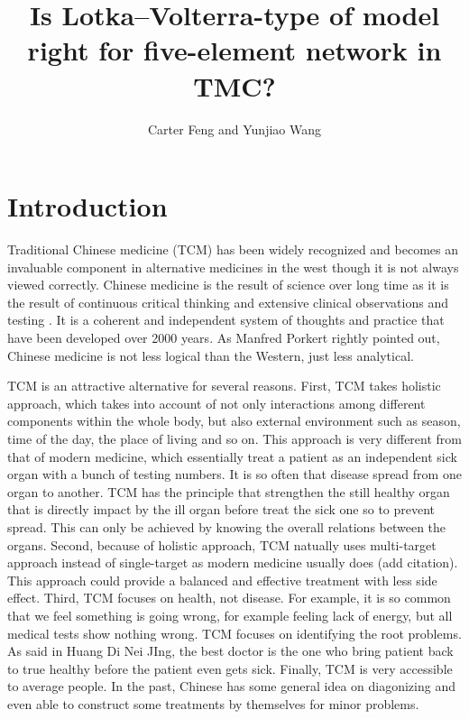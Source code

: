 \documentclass{article}
\title{Is Lotka–Volterra-type of model right for five-element network in TMC?}
\author{Carter Feng and Yunjiao Wang}
\begin{document}
\renewcommand{\figurename}{Figure}
\renewcommand{\tablename}{Table}
\renewcommand{\refname}{References}

\maketitle
\begin{abstract}
    
\end{abstract}
\section{Introduction}

Traditional Chinese medicine (TCM) has been widely recognized  and becomes an invaluable component in alternative medicines in the west \cite{Kaptchuk2000} though it is not always viewed correctly.   Chinese medicine is the result of science over long time as it is the result of continuous critical thinking and extensive clinical observations and testing \cite{Kaptchuk2000}. It is a coherent and independent system of thoughts and practice that have been developed over 2000 years.   As Manfred Porkert \cite{Porkert1990} rightly pointed out, Chinese medicine is not less logical than the Western, just less analytical. 

TCM is an attractive alternative for several reasons.
First, TCM takes holistic approach, which takes into account of not only interactions among different components within the whole body, but also external environment such as season, time of the day, the place of living and so on. This approach is very different from that of modern medicine, which essentially treat a patient as an independent sick organ with a bunch of testing numbers. It is so often that disease spread from one organ to another. TCM has the principle that strengthen the still healthy organ that is directly impact by the ill organ before treat the sick one so to prevent spread. This can only be achieved by knowing the overall relations between the organs. Second, because of holistic approach, TCM natually uses multi-target approach instead of single-target as  modern medicine usually does (add citation). This approach could provide a balanced and effective treatment with less side effect. Third, TCM focuses on health, not disease. For example, it is so common that we feel something is going wrong, for example feeling lack of energy, but all medical tests show nothing wrong.  TCM focuses on identifying the root problems. As said in Huang Di Nei JIng, the best doctor is the one who bring patient back to true healthy before the patient even gets sick. 
Finally,  TCM  is very  accessible to average people. In the past, Chinese has some general idea on diagonizing and even able to construct some treatments by themselves for minor problems. 
\end{document}
